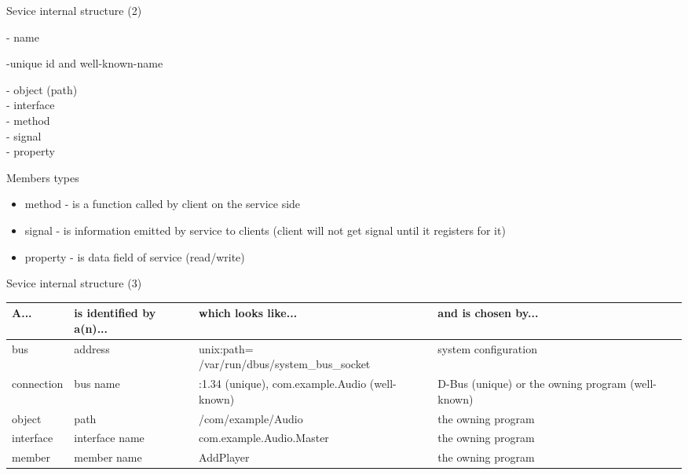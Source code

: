 \documentclass{beamer}
\begin{document}
\begin{frame}{Sevice internal structure (2)}
\begin{huge}
- name 
\begin{normalsize}
-unique id and well-known-name\\
\end{normalsize}
\hspace{1cm}- object (path)\\
\hspace{2cm}- interface\\
\hspace{3cm}- method\\
\hspace{3cm}- signal\\
\hspace{3cm}- property\\
\end{huge}
\end{frame}

\begin{frame}{Members types}
  \begin{itemize}
    \item method - is a function called by client on the service side
    \item signal - is information emitted by service to clients (client will not get signal until it registers for it)
    \item property - is data field of service (read/write)
  \end{itemize}
\end{frame}

\begin{frame}{Sevice internal structure (3)}
  \begin{center}
    \begin{tiny}
      \begin{tabulary}{1.0\textwidth}{|L|L|L|L|}
\hline
A... & is identified by a(n)... & which looks like... & and is chosen by...\\
\hline
\hline
bus & address & unix:path= /var/run/dbus/system\_bus\_socket & system configuration\\
\hline
connection & bus name & :1.34 (unique), com.example.Audio (well-known) & D-Bus (unique) or the owning program (well-known)\\
\hline
object & path & /com/example/Audio & the owning program\\
\hline
interface & interface name & com.example.Audio.Master & the owning program\\
\hline
member & member name & AddPlayer & the owning program\\
\hline
      \end{tabulary}
    \end{tiny}
  \end{center}
\end{frame}
\end{document}
